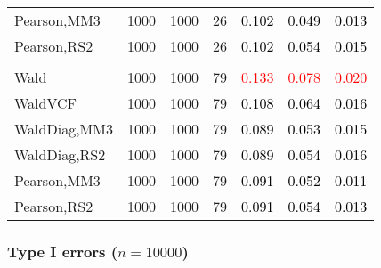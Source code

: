 \documentclass[
]{article}
\begin{document}
\begin{table}[H]
{\begin{tabular}[t]{lrrrrrr}
\hspace{1em}Pearson,MM3 & 1000 & 1000 & 26 & \textcolor{black}{0.102} & \textcolor{black}{0.049} & \textcolor{black}{0.013}\\
\hspace{1em}Pearson,RS2 & 1000 & 1000 & 26 & \textcolor{black}{0.102} & \textcolor{black}{0.054} & \textcolor{black}{0.015}\\
\addlinespace[0.3em]
\multicolumn{7}{l}{\textbf{3F 15V}}\\
\hspace{1em}Wald & 1000 & 1000 & 79 & \textcolor{red}{0.133} & \textcolor{red}{0.078} & \textcolor{red}{0.020}\\
\hspace{1em}WaldVCF & 1000 & 1000 & 79 & \textcolor{black}{0.108} & \textcolor{black}{0.064} & \textcolor{black}{0.016}\\
\hspace{1em}WaldDiag,MM3 & 1000 & 1000 & 79 & \textcolor{black}{0.089} & \textcolor{black}{0.053} & \textcolor{black}{0.015}\\
\hspace{1em}WaldDiag,RS2 & 1000 & 1000 & 79 & \textcolor{black}{0.089} & \textcolor{black}{0.054} & \textcolor{black}{0.016}\\
\hspace{1em}Pearson,MM3 & 1000 & 1000 & 79 & \textcolor{black}{0.091} & \textcolor{black}{0.052} & \textcolor{black}{0.011}\\
\hspace{1em}Pearson,RS2 & 1000 & 1000 & 79 & \textcolor{black}{0.091} & \textcolor{black}{0.054} & \textcolor{black}{0.013}\\
\bottomrule
\end{tabular}}
\endgroup{}
\end{table}

\hypertarget{type-i-errors-n10000-2}{%
\subsubsection{\texorpdfstring{Type I errors
(\(n=10000\))}{Type I errors (n=10000)}}\label{type-i-errors-n10000-2}}
\end{document}
